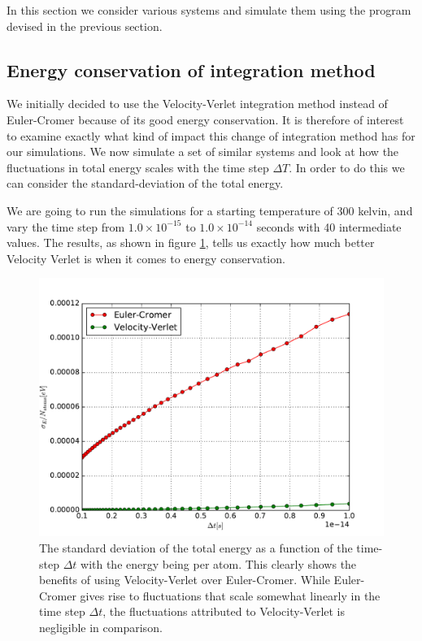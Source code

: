 \documentclass[a4paper]{article}
\begin{document}
In this section we consider various systems and simulate them using the program
devised in the previous section.

\subsection{Energy conservation of integration method}
\label{sub:energy_conservation_of_integration_method}

We initially decided to use the Velocity-Verlet integration method instead of
Euler-Cromer because of its good energy conservation. It is therefore of
interest to examine exactly what kind of impact this change of integration
method has for our simulations.  We now simulate a set of similar systems and
look at how the fluctuations in total energy scales with the time step $\Delta
T$. In order to do this we can consider the standard-deviation of the total
energy. 

We are going to run the simulations for a starting temperature of 300 kelvin,
and vary the time step from $1.0 \times 10^{-15}$ to $1.0 \times 10^{-14}$
seconds with 40 intermediate values. The results, as shown in figure
\ref{fig:energy_fluctuations}, tells us exactly how much better Velocity Verlet
is when it comes to energy conservation.

\begin{figure}[h]
    \centering \includegraphics[width=0.8\linewidth]{energy_fluctuations.pdf}
    \caption[Energy fluctuations]{The standard deviation of the total energy as
        a function of the time-step $\Delta t$ with the energy being per atom.
        This clearly shows the benefits of using Velocity-Verlet over
    Euler-Cromer. While Euler-Cromer gives rise to fluctuations that scale
somewhat linearly in the time step $\Delta t$, the fluctuations attributed to
Velocity-Verlet is negligible in comparison.}
    \label{fig:energy_fluctuations}
\end{figure}
\end{document}
